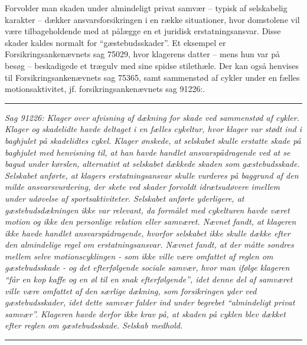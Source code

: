 \documentclass[]{book}
\begin{document}
Forvolder man skaden under almindeligt privat samvær -- typisk af selskabelig karakter -- dækker ansvarsforsikringen i en række situationer, hvor domstolene vil være tilbageholdende med at pålægge en et juridisk erstatningsansvar. Disse skader kaldes normalt for ``gæstebudsskader''. Et eksempel er Forsikringsankenævnets sag 75029, hvor klagerens datter -- mens hun var på besøg -- beskadigede et trægulv med sine spidse stilethæle. Der kan også henvises til Forsikringsankenævnets sag 75365, samt sammenstød af cykler under en fælles motionsaktivitet, jf. forsikringsankenævnets sag 91226:.

\begin{center}\rule{0.5\linewidth}{\linethickness}\end{center}

\emph{Sag 91226: Klager over afvisning af dækning for skade ved sammenstød af cykler. Klager og skadelidte havde deltaget i en fælles cykeltur, hvor klager var stødt ind i baghjulet på skadelidtes cykel. Klager ønskede, at selskabet skulle erstatte skade på baghjulet med henvisning til, at han havde handlet ansvarspådragende ved at se bagud under kørslen, alternativt at selskabet dækkede skaden som gæstebudsskade. Selskabet anførte, at klagers erstatningsansvar skulle vurderes på baggrund af den milde ansvarsvurdering, der skete ved skader forvoldt idrætsudøvere imellem under udøvelse af sportsaktiviteter. Selskabet anførte yderligere, at gæstebudsdækningen ikke var relevant, da formålet med cykelturen havde været motion og ikke den personlige relation eller samværet. Nævnet fandt, at klageren ikke havde handlet ansvarspådragende, hvorfor selskabet ikke skulle dække efter den almindelige regel om erstatningsansvar. Nævnet fandt, at der måtte sondres mellem selve motionscyklingen - som ikke ville være omfattet af reglen om gæstebudsskade - og det efterfølgende sociale samvær, hvor man ifølge klageren ``får en kop kaffe og en øl til en snak efterfølgende'', idet denne del af samværet ville være omfattet af den særlige dækning, som forsikringen yder ved gæstebudsskader, idet dette samvær falder ind under begrebet ``almindeligt privat samvær''. Klageren havde derfor ikke krav på, at skaden på cyklen blev dækket efter reglen om gæstebudsskade. Selskab medhold.}

\begin{center}\rule{0.5\linewidth}{\linethickness}\end{center}
\end{document}
